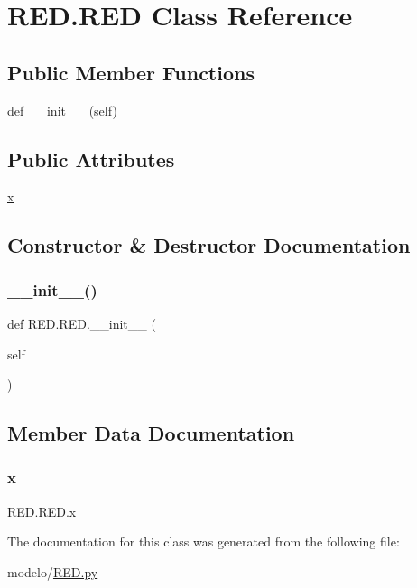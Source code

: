 \hypertarget{class_r_e_d_1_1_r_e_d}{}\section{R\+E\+D.\+R\+ED Class Reference}
\label{class_r_e_d_1_1_r_e_d}
\subsection*{Public Member Functions}
\begin{DoxyCompactItemize}
\item 
def \mbox{\hyperlink{class_r_e_d_1_1_r_e_d_a60f43d13916b0a071771c23e5b05c6e1}{\+\_\+\+\_\+init\+\_\+\+\_\+}} (self)
\end{DoxyCompactItemize}
\subsection*{Public Attributes}
\begin{DoxyCompactItemize}
\item 
\mbox{\hyperlink{class_r_e_d_1_1_r_e_d_a12bb0193815b384ccb98521ff000a732}{x}}
\end{DoxyCompactItemize}


\subsection{Constructor \& Destructor Documentation}
\mbox{\label{class_r_e_d_1_1_r_e_d_a60f43d13916b0a071771c23e5b05c6e1}} 
\subsubsection{\texorpdfstring{\+\_\+\+\_\+init\+\_\+\+\_\+()}{\_\_init\_\_()}}
{\footnotesize\ttfamily def R\+E\+D.\+R\+E\+D.\+\_\+\+\_\+init\+\_\+\+\_\+ (\begin{DoxyParamCaption}\item[{}]{self }\end{DoxyParamCaption})}



\subsection{Member Data Documentation}
\mbox{\label{class_r_e_d_1_1_r_e_d_a12bb0193815b384ccb98521ff000a732}} 
\subsubsection{\texorpdfstring{x}{x}}
{\footnotesize\ttfamily R\+E\+D.\+R\+E\+D.\+x}



The documentation for this class was generated from the following file\+:\begin{DoxyCompactItemize}
\item 
modelo/\mbox{\hyperlink{_r_e_d_8py}{R\+E\+D.\+py}}\end{DoxyCompactItemize}
